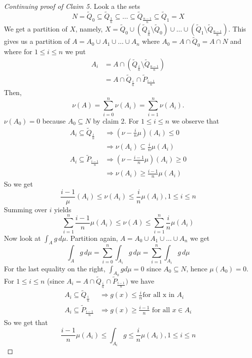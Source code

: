 \documentclass[letterpaper, 12pt]{article}
\theoremstyle{stdthm}
\theoremstyle{stddef}
\theoremstyle{stdnonum}
\theoremstyle{stdqands}
\theoremstyle{stdbold}
\begin{document}
\begin{proof}[Continuing proof of Claim 5]
Look a the sets 
\[N = \tilde{Q}_0 \subseteq \tilde{Q}_{\frac{1}{n}} \subseteq \dots \subseteq \tilde{Q}_{\frac{n-1}{n}} \subseteq \tilde{Q}_1 = X \]
We get a partition of $X$, namely, $X = \tilde{Q}_0 \cup (\tilde{Q}_{\frac{1}{n}} \setminus \tilde{Q}_0) \cup \dots \cup (\tilde{Q}_1 \setminus \tilde{Q}_{\frac{n-1}{n}})$.  This gives us a partition of $A = A_0 \cup A_1 \cup \dots \cup A_n$ where $A_0 = A \cap \tilde{Q}_0 = A \cap N$ and where for $1\leq i \leq n$ we put
\begin{align*}
A_i &= A \cap \left(\tilde{Q}_{\frac{i}{n}} \setminus \tilde{Q}_{\frac{n-1}{n}}\right)\\
&= A \cap \tilde{Q}_{\frac{i}{n}} \cap \tilde{P}_{\frac{i-1}{n}}
\end{align*}
Then, 
\[\nu(A) = \sum_{i=0}^n \nu(A_i) = \sum_{i=1}^n \nu(A_i). \]
$\nu(A_0) = 0 $ because $A_0 \subseteq N$ by claim 2. For $1\leq i \leq n$ we observe that 
\begin{align*}
A_i \subseteq \tilde{Q}_{\frac{i}{n}} & \Longrightarrow (\nu - \frac{i}{n}\mu)(A_i) \leq 0\\
&\Longrightarrow \nu(A_i) \subseteq \frac{i}{n} \mu(A_i)\\
A_i \subseteq \tilde{P}_{\frac{i-1}{n}} &\Longrightarrow (\nu - \frac{i-1}{n}\mu)(A_i) \geq 0 \\
&\Longrightarrow \nu(A_i) \geq \frac{i-1}{n} \mu(A_i)
\end{align*}
So we get 
\[ \frac{i-1}{\mu}(A_i) \leq \nu(A_i) \leq \frac{i}{n} \mu(A_i), 1\leq i \leq n \]
Summing over $i$ yields 
\[ \tag{$\diamond$} \sum_{i=1}^n \frac{i-1}{n}\mu(A_i) \leq \nu(A) \leq \sum_{i=1}^n \frac{i}{n} \mu(A_i) \]
Now look at $\int_A g \, d\mu$. Partition again, $A = A_0 \cup A_1 \cup \dots \cup A_n$ we get 
\[ \int_A g\, d\mu = \sum_{i=0}^n \int_{A_i} g\, d\mu = \sum_{i=1}^n \int_{A_i} g\, d\mu\]
For the last equality on the right, $\int_{A_0} g d\mu = 0$ since $A_0 \subseteq N$, hence $\mu(A_0) = 0$.  For $1 \leq i \leq n$ (since $A_i = A \cap \tilde{Q}_{\frac{i}{n}} \cap \tilde{P}_{\frac{i-1}{n}})$ we have  
\begin{align*}
A_i \subseteq \tilde{Q}_{\frac{i}{n}} &\Rightarrow g(x) \leq \frac{i}{n} \mbox{for all x in }A_i\\
A_i \subseteq \tilde{P}_{\frac{i-1}{n}} &\Rightarrow g(x) \geq \frac{i-1}{n} \mbox{ for all }x \in A_i
\end{align*}
So we get that 
\[\frac{i-1}{n} \mu(A_i) \leq \int_{A_i} g \leq \frac{i}{n} \mu(A_i), 1\leq i \leq n \]

\end{proof}
\end{document}
